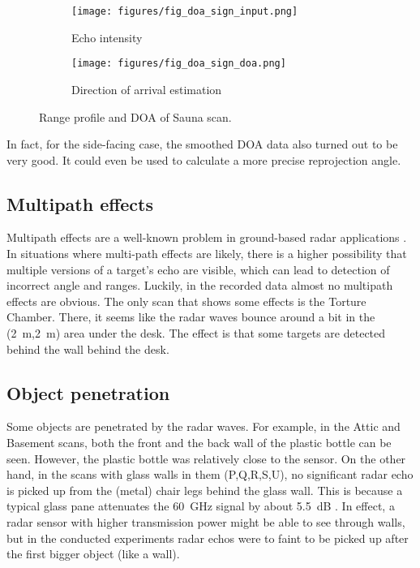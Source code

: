 \begin{figure}[htbp]
    \centering
    \begin{subfigure}[b]{0.45\textwidth}
        \texttt{[image: figures/fig\_doa\_sign\_input.png]}
        \caption{\label{fig:sauna_input}Echo intensity}
    \end{subfigure}%
    \hfill%
    \begin{subfigure}[b]{0.45\textwidth}
        \texttt{[image: figures/fig\_doa\_sign\_doa.png]}
        \caption{\label{fig:sauna_doa}Direction of arrival estimation}
    \end{subfigure}
    \caption{Range profile and DOA of Sauna scan.}
    \label{fig:sauna}
\end{figure}

In fact, for the side-facing case, the smoothed DOA data also turned out
to be very good. It could even be used to calculate a more precise
reprojection angle.

\subsection{Multipath effects}\label{multipath-effects}

Multipath effects are a well-known problem in ground-based radar
applications \cite{Adams2012}. In situations where multi-path effects
are likely, there is a higher possibility that multiple versions of a
target's echo are visible, which can lead to detection of incorrect
angle and ranges. Luckily, in the recorded data almost no multipath
effects are obvious. The only scan that shows some effects is the
Torture Chamber. There, it seems like the radar waves bounce around a
bit in the (\SI{2}{m},\SI{2}{m}) area under the desk. The effect is that some targets
are detected behind the wall behind the desk.



\subsection{Object penetration}\label{object-penetration}

Some objects are penetrated by the radar waves. For example, in the
Attic and Basement scans, both the front and the back wall of the
plastic bottle can be seen. However, the plastic bottle was relatively
close to the sensor. On the other hand, in the scans with glass walls in
them (P,Q,R,S,U), no significant radar echo is picked up from the
(metal) chair legs behind the glass wall. This is because a typical
glass pane attenuates the \SI{60}{GHz} signal by about \SI{5.5}{dB} \cite{Lu2014}. In
effect, a radar sensor with higher transmission power might be able to
see through walls, but in the conducted experiments radar echos were to
faint to be picked up after the first bigger object (like a wall).

